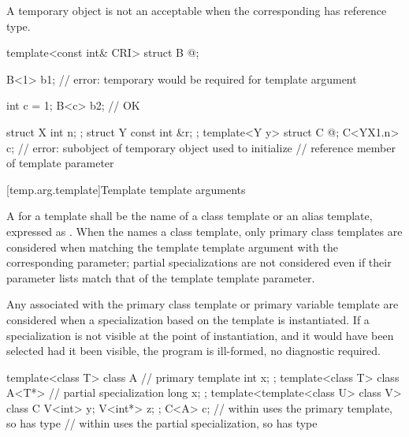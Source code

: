 \pnum
\begin{note}
A temporary object
is not an acceptable
when the corresponding
has reference type.
\begin{example}
\begin{codeblock}
template<const int& CRI> struct B { @\commentellip@ };

B<1> b1;                        // error: temporary would be required for template argument

int c = 1;
B<c> b2;                        // OK

struct X { int n; };
struct Y { const int &r; };
template<Y y> struct C { @\commentellip@ };
C<Y{X{1}.n}> c;                 // error: subobject of temporary object used to initialize
                                // reference member of template parameter
\end{codeblock}
\end{example}
\end{note}

[temp.arg.template]{Template template arguments}

\pnum
A
for a template
shall be the name of a class template or an alias template, expressed as
.
When the  names a class
template, only primary class templates are considered when matching the template template
argument with the corresponding parameter; partial specializations are not
considered even if their parameter lists match that of the template template
parameter.

\pnum
Any  associated with the
primary class template or primary variable template are considered when a
specialization based on the template
is instantiated.
If a specialization is not visible at the point of instantiation,
and it would have been selected had it been visible, the program is ill-formed,
no diagnostic required.
\begin{example}
\begin{codeblock}
template<class T> class A {     // primary template
  int x;
};
template<class T> class A<T*> { // partial specialization
  long x;
};
template<template<class U> class V> class C {
  V<int>  y;
  V<int*> z;
};
C<A> c;             //  within  uses the primary template, so  has type 
                    //  within  uses the partial specialization, so  has type 
\end{codeblock}
\end{example}

